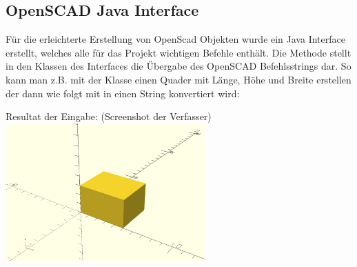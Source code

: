 \subsection{OpenSCAD Java Interface}
Für die erleichterte Erstellung von OpenScad Objekten wurde ein Java Interface  erstellt, welches alle für das Projekt wichtigen Befehle enthält.
Die Methode  stellt in den Klassen des Interfaces die Übergabe des OpenSCAD Befehlsstrings dar.
So kann man z.B. mit der Klasse  einen Quader mit Länge, Höhe und Breite erstellen der dann wie folgt mit  in einen String konvertiert wird:
\\
\begin{Bild}{Resultat der Eingabe:  (Screenshot der Verfasser)}
	\includegraphics[height = 200px]{Bilder/Quader}
\end{Bild}